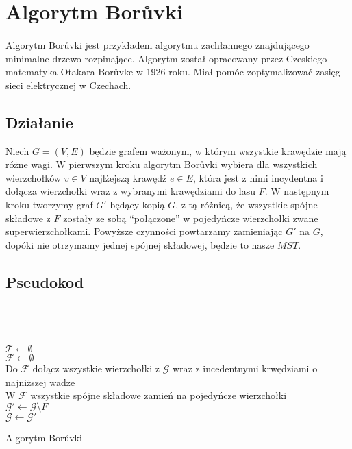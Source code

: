 \section{Algorytm Borůvki}

\label{sec:boruvka}

\paragraph{} Algorytm Borůvki jest przykładem algorytmu zachłannego znajdującego minimalne drzewo rozpinające. Algorytm został opracowany przez 
Czeskiego matematyka Otakara Borůvke w 1926 roku. Miał pomóc zoptymalizować zasięg sieci elektrycznej w Czechach. 

\subsection{Działanie}
Niech $G = (V, E)$ będzie grafem ważonym, w którym wszystkie krawędzie mają różne wagi.
W pierwszym kroku algorytm Borůvki wybiera dla wszystkich wierzchołków $ v \in V$ najlżejszą krawędź $e \in E$,
która jest z nimi incydentna i dołącza  wierzchołki wraz z wybranymi krawędziami do lasu $F$. W następnym kroku 
tworzymy graf $G'$ będący kopią $G$, z tą różnicą, że wszystkie spójne składowe z $F$ zostały ze sobą ``połączone'' w pojedyńcze wierzchołki zwane      
superwierzchołkami. Powyższe czynności powtarzamy zamieniając $G'$ na $G$, dopóki nie otrzymamy jednej spójnej składowej, będzie to nasze $MST$.

\subsection{Pseudokod}

\begin{algorithm}[H]
  \DontPrintSemicolon
  \\
  \\
  \\
$\mathcal{T} \leftarrow \emptyset$  \\
$\mathcal{F} \leftarrow \emptyset$  \\
  {
     Do $\mathcal{F}$ dołącz wszystkie wierzchołki z $\mathcal{G}$ wraz z incedentnymi krwędziami o najniższej wadze\\
     W $\mathcal{F}$ wszystkie spójne składowe zamień na pojedyńcze wierzchołki\\
     $\mathcal{G'} \leftarrow \mathcal{G} \setminus F$ \\
     $\mathcal{G} \leftarrow \mathcal{G'}$
  }
  \caption{Algorytm Borůvki}
  \label{alg-boruvka}
\end{algorithm}


